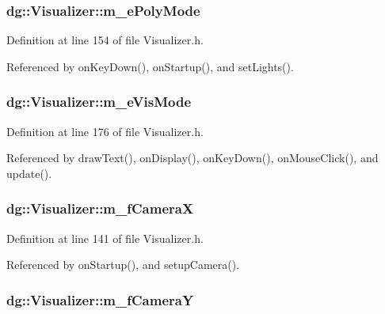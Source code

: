 \subsubsection{ dg::Visualizer::m\_\-e\-Poly\-Mode\hspace{0.3cm}{\tt  [protected]}}\label{classdg_1_1Visualizer_n42}




Definition at line 154 of file Visualizer.h.

Referenced by on\-Key\-Down(), on\-Startup(), and set\-Lights().
\subsubsection{ dg::Visualizer::m\_\-e\-Vis\-Mode\hspace{0.3cm}{\tt  [protected]}}\label{classdg_1_1Visualizer_n54}




Definition at line 176 of file Visualizer.h.

Referenced by draw\-Text(), on\-Display(), on\-Key\-Down(), on\-Mouse\-Click(), and update().
\subsubsection{ dg::Visualizer::m\_\-f\-Camera\-X\hspace{0.3cm}{\tt  [protected]}}\label{classdg_1_1Visualizer_n33}




Definition at line 141 of file Visualizer.h.

Referenced by on\-Startup(), and setup\-Camera().
\subsubsection{ dg::Visualizer::m\_\-f\-Camera\-Y\hspace{0.3cm}{\tt  [protected]}}\label{classdg_1_1Visualizer_n34}




